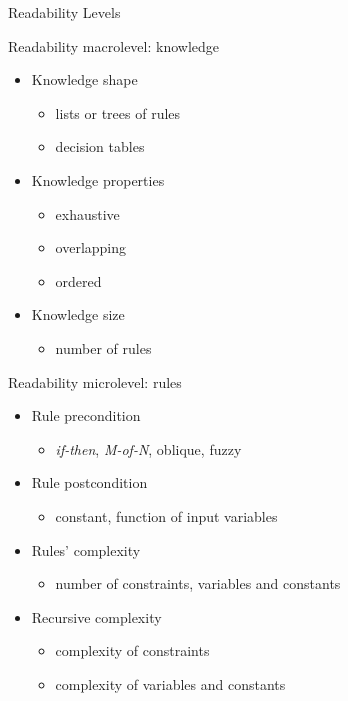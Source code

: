 \documentclass{beamer}
\newcommand{\eg}{\item[e.g.]}
\begin{document}
\begin{frame}[allowframebreaks]{Readability Levels}
	
	\begin{block}{Readability macrolevel: knowledge}
		\medskip
		\begin{itemize}
			\item Knowledge shape
			\begin{itemize}
				\eg lists or trees of rules
				\eg decision tables
			\end{itemize}
			\medskip
			\item Knowledge properties
			\begin{itemize}
				\item exhaustive
				\item overlapping
				\item ordered
			\end{itemize}
			\medskip
			\item Knowledge size
			\begin{itemize}
				\eg number of rules
			\end{itemize}
		\end{itemize}
		\medskip
	\end{block}
	
	\framebreak
	
	\begin{block}{Readability microlevel: rules}
		\medskip
		\begin{itemize}
			\item Rule precondition
			\begin{itemize}
				\eg \emph{if-then}, \emph{M-of-N}, oblique, fuzzy
			\end{itemize}
			\medskip
			\item Rule postcondition
			\begin{itemize}
				\eg constant, function of input variables
			\end{itemize}
			\medskip
			\item Rules' complexity
			\begin{itemize}
				\eg number of constraints, variables and constants
			\end{itemize}
			\medskip
			\item Recursive complexity
			\begin{itemize}
				\eg complexity of constraints
				\eg complexity of variables and constants
			\end{itemize}
		\end{itemize}
		\medskip
	\end{block}
	
\end{frame}
\end{document}

